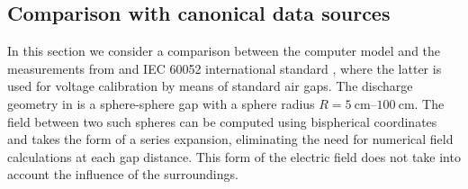 \documentclass{iopjournal}
\begin{document}

\subsection{Comparison with canonical data sources}
\label{sec:CanonicalComparison}
In this section we consider a comparison between the computer model and the measurements from \textcite{Dakin1974} and IEC 60052 international standard \cite{IEC60052}, where the latter is used for voltage calibration by means of standard air gaps.
The discharge geometry in \cite{IEC60052} is a sphere-sphere gap with a sphere radius $R=\SIrange{5}{100}{\centi\meter}$.
The field between two such spheres can be computed using bispherical coordinates and takes the form of a series expansion, eliminating the need for numerical field calculations at each gap distance.
This form of the electric field does not take into account the influence of the surroundings.
\end{document}
